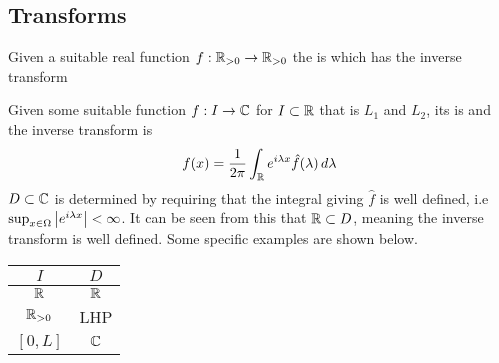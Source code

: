 \documentclass{article}
\begin{document}
\subsection{Transforms}

\begin{definition}
Given a suitable real function $f : \mathbb{R}_{>0} \to \mathbb{R}_{>0}$ the  is 
which has the inverse transform 
\end{definition}

\begin{definition}
Given some suitable function $f:I \to \mathbb{C}$ for $I \subset \mathbb{R}$ that is $L_1$ and $L_2$, its  is 
and the inverse transform is 
\[
f(x) = \frac{1}{2\pi} \int_{\mathbb{R}} e^{i\lambda x} \hat{f}(\lambda) \, d\lambda
\]
$D\subset \mathbb{C}$ is determined by requiring that the integral giving $\hat{f}$ is well defined, i.e $\sup_{x \in \Omega } \left\lvert e^{i\lambda x} \right\rvert < \infty$. It can be seen from this that $\mathbb{R} \subset D$, meaning the inverse transform is well defined. Some specific examples are shown below.
\begin{table}[ht]
\centering 
\begin{tabular}{c|c} 
$I$ & $D$ \\ [0.5ex] 
\hline\hline 
$\mathbb{R}$ &  $\mathbb{R}$ \\
\hline %
$\mathbb{R}_{>0}$ & LHP \\
\hline
$[0,L]$ & $\mathbb{C}$ \\ [1ex] %
\end{tabular}
\end{table}

\end{definition}

\begin{lemma}
\end{lemma}

\end{document}
